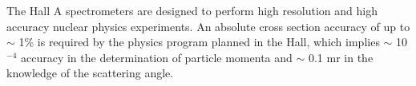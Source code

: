 \label{chap:hrs}

   
The Hall A spectrometers are designed to 
perform high resolution and high accuracy nuclear physics experiments.  
An absolute cross section accuracy of up to $\sim$ 1\% is 
required by the physics program planned in the Hall, which implies 
$\sim$ 10$^{-4}$ accuracy in the determination of particle momenta and 
$\sim$ 0.1 mr in the knowledge of the scattering angle.

